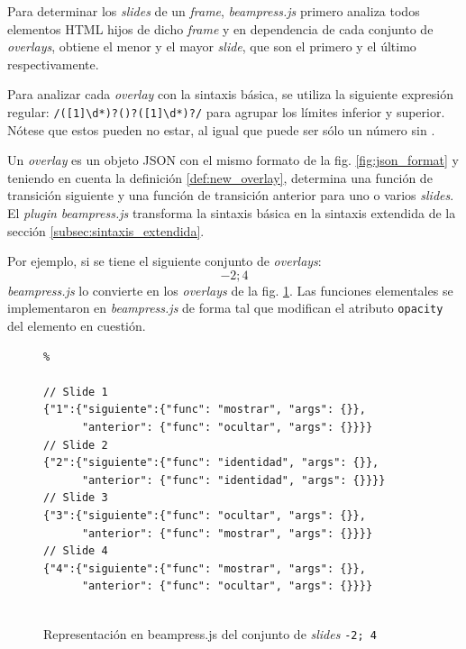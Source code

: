 			Para determinar los \textit{slides} de un \textit{frame}, \textit{beampress.js} primero analiza todos elementos HTML hijos de dicho \textit{frame} y en dependencia de cada conjunto de \textit{overlays}, obtiene el menor y el mayor \textit{slide}, que son el primero y el último respectivamente.

			Para analizar cada \textit{overlay} con la sintaxis básica, se utiliza la siguiente expresión regular: \texttt{/([1]\textbackslash d*)?(\textendash )?([1]\textbackslash d*)?/} para agrupar los límites inferior y superior. Nótese que estos pueden no estar, al igual que puede ser sólo un número sin \texttt{\textendash}. 

			Un \textit{overlay} es un objeto JSON con el mismo formato de la fig. \ref{fig:json_format} y teniendo en cuenta la definición \ref{def:new_overlay}, determina una función de transición siguiente y una función de transición anterior para uno o varios \textit{slides}. El \textit{plugin} \textit{beampress.js} transforma la sintaxis básica en la sintaxis extendida de la sección \ref{subsec:sintaxis_extendida}. 

			Por ejemplo, si se tiene el siguiente conjunto de \textit{overlays}: $$-2; 4$$ \textit{beampress.js} lo convierte en los \textit{overlays} de la fig. \ref{fig:overlay_set_beampress}. Las funciones elementales se implementaron en \textit{beampress.js} de forma tal que modifican el atributo \texttt{opacity} del elemento en cuestión.

				\begin{figure}[htb]%
					\begin{lstlisting}%

// Slide 1
{"1":{"siguiente":{"func": "mostrar", "args": {}},
      "anterior": {"func": "ocultar", "args": {}}}} 
// Slide 2
{"2":{"siguiente":{"func": "identidad", "args": {}},
      "anterior": {"func": "identidad", "args": {}}}}  
// Slide 3
{"3":{"siguiente":{"func": "ocultar", "args": {}},
      "anterior": {"func": "mostrar", "args": {}}}}  
// Slide 4
{"4":{"siguiente":{"func": "mostrar", "args": {}},
      "anterior": {"func": "ocultar", "args": {}}}}                                       				
	
					\end{lstlisting}
					\caption{Representación en beampress.js del conjunto de \textit{slides} \texttt{-2; 4}}
					\label{fig:overlay_set_beampress}
				\end{figure}			
					
		
			
